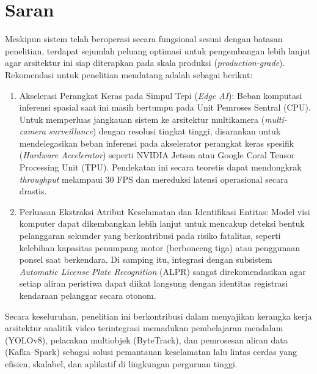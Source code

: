 \section{Saran}
\label{sec:saran}

Meskipun sistem telah beroperasi secara fungsional sesuai dengan batasan penelitian, terdapat sejumlah peluang optimasi untuk pengembangan lebih lanjut agar arsitektur ini siap diterapkan pada skala produksi (\textit{production-grade}). Rekomendasi untuk penelitian mendatang adalah sebagai berikut:

\begin{enumerate}[1.]
  \item {Akselerasi Perangkat Keras pada Simpul Tepi (\textit{Edge AI}):}
    Beban komputasi inferensi spasial saat ini masih bertumpu pada Unit Pemroses Sentral (CPU). Untuk memperluas jangkauan sistem ke arsitektur multikamera (\textit{multi-camera surveillance}) dengan resolusi tingkat tinggi, disarankan untuk mendelegasikan beban inferensi pada akselerator perangkat keras spesifik (\textit{Hardware Accelerator}) seperti NVIDIA Jetson atau Google Coral Tensor Processing Unit (TPU). Pendekatan ini secara teoretis dapat mendongkrak \textit{throughput} melampaui 30 FPS dan mereduksi latensi operasional secara drastis.

  \item {Perluasan Ekstraksi Atribut Keselamatan dan Identifikasi Entitas:}
    Model visi komputer dapat dikembangkan lebih lanjut untuk mencakup deteksi bentuk pelanggaran sekunder yang berkontribusi pada risiko fatalitas, seperti kelebihan kapasitas penumpang motor (berbonceng tiga) atau penggunaan ponsel saat berkendara. Di samping itu, integrasi dengan subsistem \textit{Automatic License Plate Recognition} (ALPR) sangat direkomendasikan agar setiap aliran peristiwa dapat diikat langsung dengan identitas registrasi kendaraan pelanggar secara otonom.

\end{enumerate}

Secara keseluruhan, penelitian ini berkontribusi dalam menyajikan kerangka kerja arsitektur analitik video terintegrasi memadukan pembelajaran mendalam (YOLOv8), pelacakan multiobjek (ByteTrack), dan pemrosesan aliran data (Kafka--Spark) sebagai solusi pemantauan keselamatan lalu lintas cerdas yang efisien, skalabel, dan aplikatif di lingkungan perguruan tinggi.

